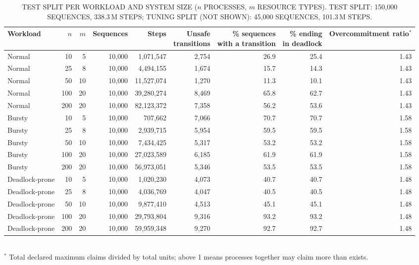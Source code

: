 \begin{table}[t]
\centering
\scriptsize
\caption{TEST SPLIT PER WORKLOAD AND SYSTEM SIZE ($n$ PROCESSES, $m$ RESOURCE TYPES). TEST SPLIT: 150,000 SEQUENCES, 338.3\,M STEPS; TUNING SPLIT (NOT SHOWN): 45,000 SEQUENCES, 101.3\,M STEPS.}
\label{tab:setup}
\begin{tabular}{lrrrrrrrr}
\toprule
Workload & $n$ & $m$ & Sequences & Steps & \shortstack{Unsafe\\transitions} & \shortstack{\% sequences\\with a transition} & \shortstack{\% ending\\in deadlock} & \shortstack{Overcommitment\\ratio$^\ast$} \\
\midrule
Normal & 10 & 5 & 10{,}000 & 1{,}071{,}547 & 2{,}754 & 26.9 & 25.4 & 1.43 \\
Normal & 25 & 8 & 10{,}000 & 4{,}494{,}155 & 1{,}674 & 15.7 & 14.3 & 1.43 \\
Normal & 50 & 10 & 10{,}000 & 11{,}527{,}074 & 1{,}270 & 11.3 & 10.1 & 1.43 \\
Normal & 100 & 20 & 10{,}000 & 39{,}280{,}274 & 8{,}469 & 65.8 & 62.7 & 1.43 \\
Normal & 200 & 20 & 10{,}000 & 82{,}123{,}372 & 7{,}358 & 56.2 & 53.6 & 1.43 \\
Bursty & 10 & 5 & 10{,}000 & 707{,}662 & 7{,}066 & 70.7 & 70.7 & 1.58 \\
Bursty & 25 & 8 & 10{,}000 & 2{,}939{,}715 & 5{,}954 & 59.5 & 59.5 & 1.58 \\
Bursty & 50 & 10 & 10{,}000 & 7{,}434{,}425 & 5{,}317 & 53.2 & 53.2 & 1.58 \\
Bursty & 100 & 20 & 10{,}000 & 27{,}023{,}589 & 6{,}185 & 61.9 & 61.9 & 1.58 \\
Bursty & 200 & 20 & 10{,}000 & 56{,}973{,}051 & 5{,}346 & 53.5 & 53.5 & 1.58 \\
Deadlock-prone & 10 & 5 & 10{,}000 & 1{,}020{,}230 & 4{,}073 & 40.7 & 40.7 & 1.48 \\
Deadlock-prone & 25 & 8 & 10{,}000 & 4{,}036{,}769 & 4{,}047 & 40.5 & 40.5 & 1.48 \\
Deadlock-prone & 50 & 10 & 10{,}000 & 9{,}877{,}410 & 4{,}513 & 45.1 & 45.1 & 1.48 \\
Deadlock-prone & 100 & 20 & 10{,}000 & 29{,}793{,}804 & 9{,}316 & 93.2 & 93.2 & 1.48 \\
Deadlock-prone & 200 & 20 & 10{,}000 & 59{,}959{,}348 & 9{,}270 & 92.7 & 92.7 & 1.48 \\
\bottomrule
\end{tabular}
\\[2pt]{\scriptsize $^\ast$ Total declared maximum claims divided by total units; above 1 means processes together may claim more than exists.}
\end{table}
